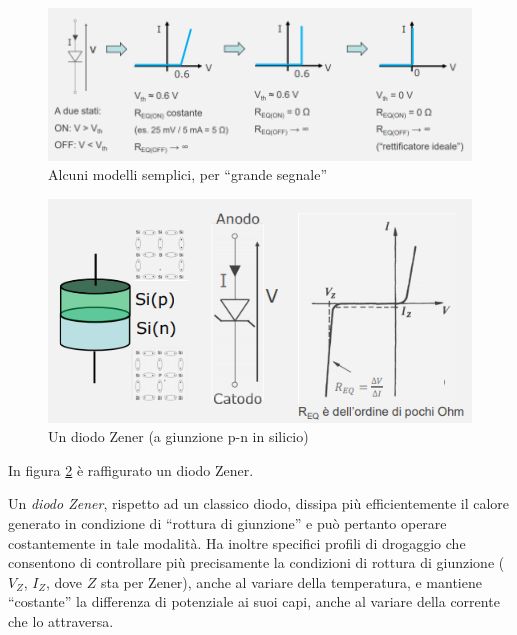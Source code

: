 \documentclass{article}
\begin{document}
\begin{figure}[h]
  \centering
  \includegraphics[scale=0.7]{IM_diodo_modelli}
  \caption{Alcuni modelli semplici, per ``grande segnale''}
  \label{Schema_diodo_modelli}
\end{figure}
\clearpage
\begin{figure}[h]
  \centering
  \includegraphics[scale=0.7]{IM_diodo_Zener}
  \caption{Un diodo Zener (a giunzione p-n in silicio)}
  \label{Schema_diodo_Zener}
\end{figure}

In figura \ref{Schema_diodo_Zener} è raffigurato un diodo Zener.

\vspace{1mm}

Un \textit{diodo Zener}, rispetto ad un classico diodo, dissipa più efficientemente il calore generato in condizione di “rottura di giunzione” e può pertanto operare costantemente in tale modalità. Ha inoltre specifici profili di drogaggio che consentono di controllare più precisamente la condizioni di rottura di giunzione ($V_Z$, $I_Z$, dove $Z$ sta per Zener), anche al variare della temperatura, e mantiene “costante” la differenza di potenziale ai suoi capi, anche al variare della corrente che lo attraversa.
\end{document}
